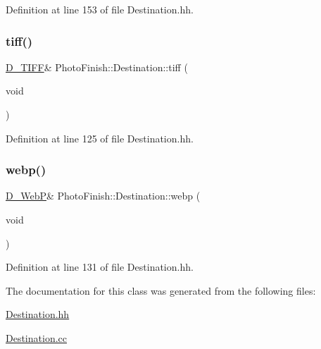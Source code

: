Definition at line 153 of file Destination.\+hh.

\mbox{\label{class_photo_finish_1_1_destination_a83342de96daf9534150e25200e8b79a9}} 
\subsubsection{\texorpdfstring{tiff()}{tiff()}}
{\footnotesize\ttfamily \hyperlink{class_photo_finish_1_1_d___t_i_f_f}{D\+\_\+\+T\+I\+FF}\& Photo\+Finish\+::\+Destination\+::tiff (\begin{DoxyParamCaption}\item[{void}]{ }\end{DoxyParamCaption})\hspace{0.3cm}{\ttfamily [inline]}}



Definition at line 125 of file Destination.\+hh.

\mbox{\label{class_photo_finish_1_1_destination_a25ae0538f3848cc1398e8b2c319b32b4}} 
\subsubsection{\texorpdfstring{webp()}{webp()}}
{\footnotesize\ttfamily \hyperlink{class_photo_finish_1_1_d___web_p}{D\+\_\+\+WebP}\& Photo\+Finish\+::\+Destination\+::webp (\begin{DoxyParamCaption}\item[{void}]{ }\end{DoxyParamCaption})\hspace{0.3cm}{\ttfamily [inline]}}



Definition at line 131 of file Destination.\+hh.



The documentation for this class was generated from the following files\+:\begin{DoxyCompactItemize}
\item 
\hyperlink{_destination_8hh}{Destination.\+hh}\item 
\hyperlink{_destination_8cc}{Destination.\+cc}\end{DoxyCompactItemize}
